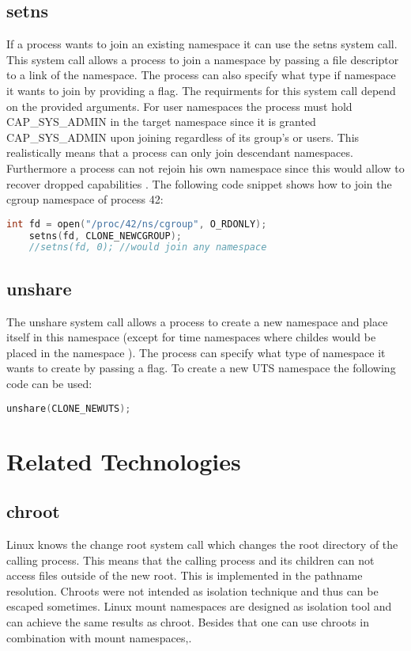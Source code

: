\documentclass[10pt,twocolumn,a4paper]{article}
\begin{document}
\subsection{ setns}
If a process wants to join an existing namespace it can use the setns system call. This system call
allows a process to join a namespace by passing a file descriptor to a link of the namespace. The
process can also specify what type if namespace it wants to join by providing a flag. The
requirments for this system call depend on the provided arguments. For user namespaces the process
must hold CAP\_SYS\_ADMIN in the target namespace since it is granted CAP\_SYS\_ADMIN upon joining
regardless of its group's or users. This realistically means that a process can only
join descendant namespaces. Furthermore a process can not rejoin his own namespace since this would
allow to recover dropped capabilities \cite{23}. The following code snippet shows how to join the
cgroup namespace of process 42:
\begin{lstlisting}[language=C]
    int fd = open("/proc/42/ns/cgroup", O_RDONLY);
    setns(fd, CLONE_NEWCGROUP);
    //setns(fd, 0); //would join any namespace
\end{lstlisting}


\subsection{ unshare}
The unshare system call allows a process to create a new namespace and place itself in this
namespace (except for  time namespaces where childes would be placed in the namespace \cite{15}). 
The process can specify what type of namespace it wants to create by passing a flag. To create a new
UTS namespace the following code can be used:
\begin{lstlisting}[language=C]
    unshare(CLONE_NEWUTS);
\end{lstlisting}\cite{24}
\section{Related Technologies}\label{sec:related}
\subsection{chroot}
Linux knows the change root system call which changes the root directory of the calling
process. This means that the calling process and its children can not access files outside of the
new root. This is implemented in the pathname resolution\cite{1}. Chroots were not intended as
isolation technique and thus can be escaped sometimes. Linux mount namespaces are
designed as isolation tool and can achieve the same results as chroot. Besides that one can use
chroots in combination with mount namespaces\cite{1},\cite{25}. 
\end{document}
